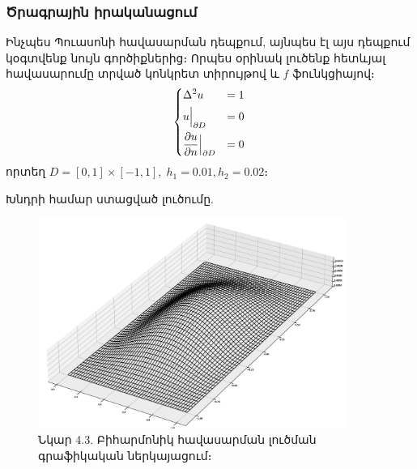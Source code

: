 \documentclass[fleqn, bachelor,subf,12pt,notitlepage]{article}
\begin{document}
\subsubsection*{Ծրագրային իրականացում}
Ինչպես Պուասոնի հավասարման դեպքում, այնպես էլ այս դեպքում կօգտվենք նույն գործիքներից։
Որպես օրինակ լուծենք հետևյալ հավասարումը տրված կոնկրետ տիրույթով և $f$ ֆունկցիայով։
$$\begin{dcases}
								\Delta^{2} u &=1 \\
								u \Big |_{\partial D} &= 0\\
								\dfrac{\partial u}{\partial n} \Big |_{\partial D} &= 0
\end{dcases}$$
որտեղ $D = \left[0, 1\right] \times \left[-1, 1\right], \; h_{1}=0.01, h_{2}=0.02$։

Խնդրի համար ստացված լուծումը.
\begin{figure}[H]
\centering
\includegraphics[width=0.9\textwidth]{images/biharmonic_equation_solution}
\captionsetup{labelformat=empty}
\caption{Նկար 4.3. Բիհարմոնիկ հավասարման լուծման գրաֆիկական ներկայացում։}
\end{figure}
\end{document}
